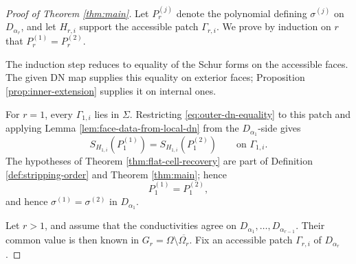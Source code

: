 \documentclass[11pt,oneside]{article}
\begin{document}
\begin{proof}[Proof of Theorem \ref{thm:main}]
Let \(P_r^{(j)}\) denote the polynomial defining \(\sigma^{(j)}\) on
\(D_{\alpha_r}\), and let \(H_{r,i}\) support the accessible patch
\(\Gamma_{r,i}\).  We prove by induction on \(r\) that
\(P_r^{(1)}=P_r^{(2)}\).

The induction step reduces to equality of the Schur forms on the accessible
faces.  The given DN map supplies this equality on exterior faces; Proposition
\ref{prop:inner-extension} supplies it on internal ones.

For \(r=1\), every \(\Gamma_{1,i}\) lies in \(\Sigma\).  Restricting
\eqref{eq:outer-dn-equality} to this patch and applying Lemma
\ref{lem:face-data-from-local-dn} from the \(D_{\alpha_1}\)-side gives
\begin{equation}
  S_{H_{1,i}}(P_1^{(1)})
  =
  S_{H_{1,i}}(P_1^{(2)})
  \qquad\text{on }\Gamma_{1,i}.
  \label{eq:first-step-face-data}
\end{equation}
The hypotheses of Theorem \ref{thm:flat-cell-recovery} are part of Definition
\ref{def:stripping-order} and Theorem \ref{thm:main}; hence
\begin{equation}
  P_1^{(1)}=P_1^{(2)},
\end{equation}
and hence \(\sigma^{(1)}=\sigma^{(2)}\) in \(D_{\alpha_1}\).

Let \(r>1\), and assume that the conductivities agree on
\(D_{\alpha_1},\ldots,D_{\alpha_{r-1}}\).  Their common value is then known in
\(G_r=\Omega\setminus\overline{\Omega_r}\).  Fix an accessible patch
\(\Gamma_{r,i}\) of \(D_{\alpha_r}\).


\end{proof}
\end{document}
